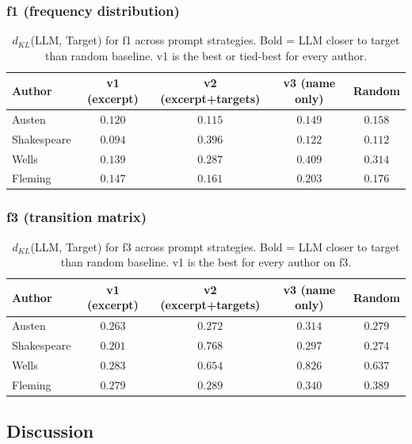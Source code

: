 \documentclass{article}
\begin{document}
\subsubsection{f1 (frequency distribution)}

\begin{table}[htbp]
\centering
\begin{tabular}{lcccc}
\toprule
Author & v1 (excerpt) & v2 (excerpt+targets) & v3 (name only) & Random \\
\midrule
Austen   & $\mathbf{0.120}$ & $\mathbf{0.115}$ & $\mathbf{0.149}$ & $0.158$ \\
Shakespeare & $\mathbf{0.094}$ & $0.396$ & $0.122$ & $0.112$ \\
Wells    & $\mathbf{0.139}$ & $\mathbf{0.287}$ & $0.409$ & $0.314$ \\
Fleming  & $\mathbf{0.147}$ & $\mathbf{0.161}$ & $0.203$ & $0.176$ \\
\bottomrule
\end{tabular}
\caption{$d_{KL}$(LLM, Target) for f1 across prompt strategies. Bold = LLM closer to target than random baseline. v1 is the best or tied-best for every author.}
\label{tab:v_comparison_f1}
\end{table}

\subsubsection{f3 (transition matrix)}

\begin{table}[htbp]
\centering
\begin{tabular}{lcccc}
\toprule
Author & v1 (excerpt) & v2 (excerpt+targets) & v3 (name only) & Random \\
\midrule
Austen   & $\mathbf{0.263}$ & $\mathbf{0.272}$ & $0.314$ & $0.279$ \\
Shakespeare & $\mathbf{0.201}$ & $0.768$ & $0.297$ & $0.274$ \\
Wells    & $\mathbf{0.283}$ & $0.654$ & $0.826$ & $0.637$ \\
Fleming  & $\mathbf{0.279}$ & $\mathbf{0.289}$ & $\mathbf{0.340}$ & $0.389$ \\
\bottomrule
\end{tabular}
\caption{$d_{KL}$(LLM, Target) for f3 across prompt strategies. Bold = LLM closer to target than random baseline. v1 is the best for every author on f3.}
\label{tab:v_comparison_f3}
\end{table}

\subsection{Discussion}
\end{document}
